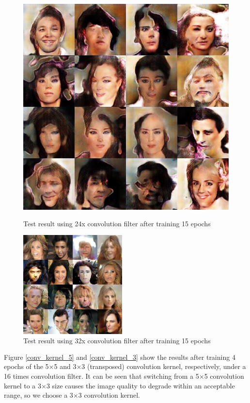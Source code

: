 \begin{figure}
\begin{minipage}[t]{0.48\linewidth}
        \includegraphics[width=\textwidth]{figures/result_conv_filter_24.png}
        \caption{Test result using 24x convolution filter after training 15 epochs}
        \label{conv_filter_24}
    \end{minipage}
    \begin{minipage}[t]{\linewidth}
        \centering
        \includegraphics[width=0.48\textwidth]{figures/result_conv_filter_32.png}
        \caption{Test result using 32x convolution filter after training 15 epochs}
        \label{conv_filter_32}
    \end{minipage}
\end{figure}

Figure \ref{conv_kernel_5} and \ref{conv_kernel_3} show the results after training 4 epochs of the 5×5 and 3×3 (transposed) convolution kernel,
    respectively, under a 16 times convolution filter.
It can be seen that switching from a 5×5 convolution kernel to a 3×3 size causes the image quality to degrade within an acceptable range,
    so we choose a 3×3 convolution kernel.

